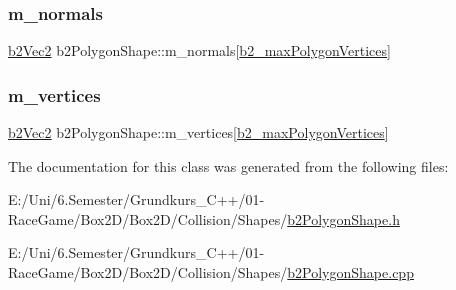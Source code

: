\mbox{\label{classb2_polygon_shape_a97cdcec277321c62ecdf93cb649958ce}} 
\subsubsection{\texorpdfstring{m\_normals}{m\_normals}}
{\footnotesize\ttfamily \mbox{\hyperlink{structb2_vec2}{b2\+Vec2}} b2\+Polygon\+Shape\+::m\+\_\+normals\mbox{[}\mbox{\hyperlink{b2_settings_8h_a09d71ee1993bee28b5b2e6d893b41884}{b2\+\_\+max\+Polygon\+Vertices}}\mbox{]}}

\mbox{\label{classb2_polygon_shape_a11ee5c107660be5da25f0e164aaccd53}} 
\subsubsection{\texorpdfstring{m\_vertices}{m\_vertices}}
{\footnotesize\ttfamily \mbox{\hyperlink{structb2_vec2}{b2\+Vec2}} b2\+Polygon\+Shape\+::m\+\_\+vertices\mbox{[}\mbox{\hyperlink{b2_settings_8h_a09d71ee1993bee28b5b2e6d893b41884}{b2\+\_\+max\+Polygon\+Vertices}}\mbox{]}}



The documentation for this class was generated from the following files\+:\begin{DoxyCompactItemize}
\item 
E\+:/\+Uni/6.\+Semester/\+Grundkurs\+\_\+\+C++/01-\/\+Race\+Game/\+Box2\+D/\+Box2\+D/\+Collision/\+Shapes/\mbox{\hyperlink{b2_polygon_shape_8h}{b2\+Polygon\+Shape.\+h}}\item 
E\+:/\+Uni/6.\+Semester/\+Grundkurs\+\_\+\+C++/01-\/\+Race\+Game/\+Box2\+D/\+Box2\+D/\+Collision/\+Shapes/\mbox{\hyperlink{b2_polygon_shape_8cpp}{b2\+Polygon\+Shape.\+cpp}}\end{DoxyCompactItemize}
